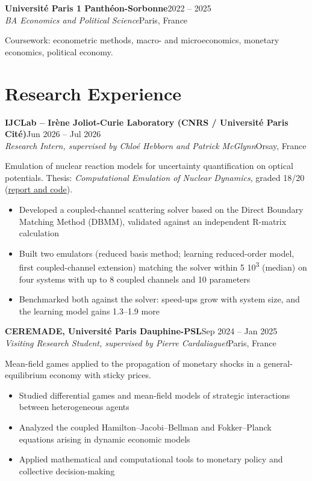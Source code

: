 \documentclass[a4paper,10pt]{article}
\newcommand{\entry}[4]{%
  \textbf{#1}\hfill #4\\
  \textit{#3}\hfill {\color{muted}#2}\par}
\newcommand{\coursework}[1]{{\small\color{muted}Coursework: #1}\par\vspace{2pt}}
\begin{document}
\entry{Université Paris 1 Panthéon-Sorbonne}{Paris, France}{BA Economics and Political Science}{2022 -- 2025}
\coursework{econometric methods, macro- and microeconomics, monetary economics, political economy.}

\section*{Research Experience}

\entry{IJCLab – Irène Joliot-Curie Laboratory (CNRS / Université Paris Cité)}{Orsay, France}%
{Research Intern, supervised by Chloé Hebborn and Patrick McGlynn}{Jun 2026 -- Jul 2026}
Emulation of nuclear reaction models for uncertainty quantification on optical potentials.
Thesis: \textit{Computational Emulation of Nuclear Dynamics}, graded 18/20
(\href{https://github.com/mksv-pro/Mike-M1-Internship-IJCLab-2026}{report and code}).
\begin{itemize}
  \item Developed a coupled-channel scattering solver based on the Direct Boundary Matching Method (DBMM), validated against an independent R-matrix calculation
  \item Built two emulators (reduced basis method; learning reduced-order model, first coupled-channel extension) matching the solver within 5\,\texttimes\,10\textsuperscript{\textminus{}3} (median) on four systems with up to 8 coupled channels and 10 parameters
  \item Benchmarked both against the solver: speed-ups grow with system size, and the learning model gains 1.3–1.9\texttimes{} more
\end{itemize}
\vspace{3pt}

\entry{CEREMADE, Université Paris Dauphine-PSL}{Paris, France}%
{Visiting Research Student, supervised by Pierre Cardaliaguet}{Sep 2024 -- Jan 2025}
Mean-field games applied to the propagation of monetary shocks in a general-equilibrium economy with sticky prices.
\begin{itemize}
  \item Studied differential games and mean-field models of strategic interactions between heterogeneous agents
  \item Analyzed the coupled Hamilton–Jacobi–Bellman and Fokker–Planck equations arising in dynamic economic models
  \item Applied mathematical and computational tools to monetary policy and collective decision-making
\end{itemize}
\vspace{3pt}
\end{document}
